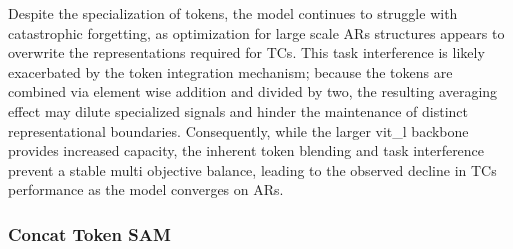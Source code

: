 Despite the specialization of tokens, the model continues to struggle with catastrophic forgetting, as optimization for large scale ARs structures appears to overwrite the representations required for TCs. This task interference is likely exacerbated by the token integration mechanism; because the tokens are combined via element wise addition and divided by two, the resulting averaging effect may dilute specialized signals and hinder the maintenance of distinct representational boundaries. Consequently, while the larger vit\_l backbone provides increased capacity, the inherent token blending and task interference prevent a stable multi objective balance, leading to the observed decline in TCs performance as the model converges on ARs.


\subsubsection{Concat Token SAM}
